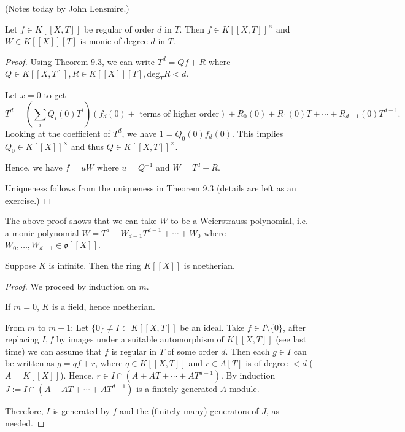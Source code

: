 
(Notes today by John Lensmire.)

\begin{corollary} %

Let $f\in K[[X,T]]$ be regular of order $d$ in $T$.
Then $f\in K[[X,T]]^\times$ and $W\in K[[X]][T]$ is monic of degree $d$ in $T$.
 \end{corollary}

\begin{proof} %

Using Theorem 9.3, we can write $T^d = Qf+R$ where $Q\in K[[X,T]], R\in K[[X]][T], \mathrm{deg}_TR < d$.

Let $x=0$ to get
$$T^d = \left( \sum_i Q_i(0) T^i \right) (f_d(0) + \textrm{ terms of higher order} )
+ R_0(0) + R_1(0) T + \cdots + R_{d-1}(0) T^{d-1}.$$
Looking at the coefficient of $T^d$, we have $1 = Q_0(0) f_d(0)$.
This implies $Q_0 \in K[[X]]^\times$ and thus $Q\in K[[X,T]]^\times$.

Hence, we have $f = uW$ where $u = Q^{-1}$ and $W = T^d - R$.

Uniqueness follows from the uniqueness in Theorem 9.3 (details are left as an exercise.)
 \end{proof}

\begin{remark}
The above proof shows that we can take $W$ to be a Weierstrauss polynomial, i.e. a monic polynomial
$W = T^d + W_{d-1} T^{d-1} + \cdots + W_0$ where $W_0,\ldots, W_{d-1}\in \mathfrak{o}[[X]]$.
\end{remark}

\begin{corollary} %
Suppose $K$ is infinite. Then the ring $K[[X]]$ is noetherian.
 \end{corollary}

\begin{proof} %
We proceed by induction on $m$.

If $m=0$, $K$ is a field, hence noetherian.

From $m$ to $m+1$:
Let $\{0\} \neq I \subset K[[X,T]]$ be an ideal.
Take $f\in I\setminus \{0\}$, after replacing $I,f$ by images under a suitable automorphism of $K[[X,T]]$
(see last time) we can assume that $f$ is regular in $T$ of some order $d$.
Then each $g\in I$ can be written as $g = qf + r$, where $q\in K[[X,T]]$ and $r\in A[T]$ is of degree $<d$ ($A = K[[X]]$).
Hence, $r\in I \cap (A + AT + \cdots + AT^{d-1})$. By induction $J:= I\cap (A + AT + \cdots + AT^{d-1})$ is a finitely generated $A$-module.

Therefore, $I$ is generated by $f$ and the (finitely many) generators of $J$, as needed.
 \end{proof}

